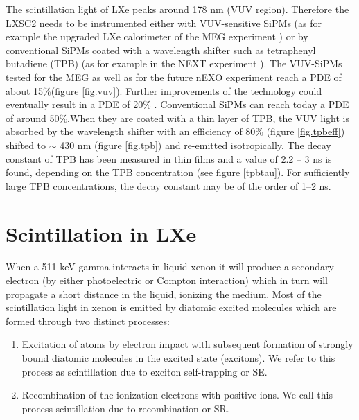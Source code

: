 \documentclass[review]{elsarticle}
\begin{document}
The scintillation light of LXe peaks around 178 nm (VUV region). Therefore the LXSC2 needs to be instrumented either with VUV-sensitive SiPMs (as for example the upgraded LXe calorimeter of the 
MEG experiment \cite{Ogawa:2015ucj}) or by conventional SiPMs coated with a wavelength shifter such as tetraphenyl butadiene (TPB) (as for example in the NEXT experiment \cite{Alvarez:2013gxa}). 
The VUV-SiPMs tested for the MEG as well as for the future nEXO 
experiment \cite{Ogawa:2015ucj,Ostrovskiy:2015oja} reach a PDE of about 
15\%(figure \ref{fig.vuv}). Further improvements of the technology could eventually result in a PDE of 20\% .  Conventional SiPMs can reach today a PDE of around 50\%.When they are coated with a thin layer of TPB, the VUV light is absorbed by the wavelength shifter with an efficiency of 80\% \cite{Gehman:2011xm} (figure \ref{fig.tpbeff}) 
shifted to $\sim$ 430 nm (figure \ref{fig.tpb}) and re-emitted isotropically. The decay constant of TPB has been measured  in thin films \cite{TPBtau} and a value of 2.2 -- 3 ns is found, depending on the TPB concentration (see figure \ref{tpbtau}). For sufficiently large TPB concentrations, the decay constant may be of the order of 1--2 ns. 
%

\section{Scintillation in LXe} \label{sec.scint}

When a 511 keV gamma interacts in liquid xenon it will produce a secondary electron (by either photoelectric or Compton interaction) which in turn will propagate a short distance in the liquid, ionizing the medium. Most of the scintillation light in xenon is emitted by diatomic excited molecules which are formed through two distinct processes:
\begin{enumerate}
\item Excitation of atoms by electron impact with subsequent formation of strongly bound diatomic molecules in the excited state (excitons). We refer to this process as scintillation due to exciton self-trapping or SE.
\item Recombination of the ionization electrons with positive ions. We call this process scintillation due to recombination or SR. 
\end{enumerate}
\end{document}
